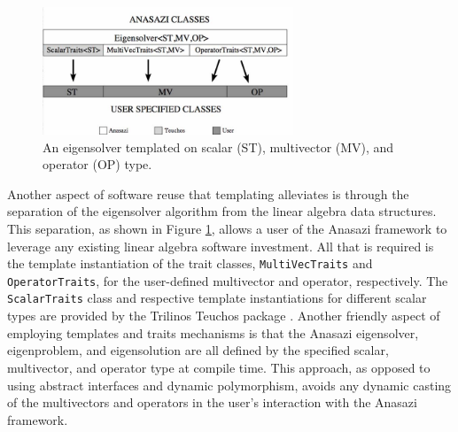 \documentclass[acmtoms,acmnow]{acmtrans2m}
\newcommand{\aspace}[1]{\texttt{#1}}
\begin{document}
\begin{figure}[htb]
\label{fig:latemplate}
\begin{center}
\includegraphics[height=1.5in]{anasazi_linalg_template}
\end{center}
\caption{An eigensolver templated on scalar (ST), multivector (MV), and
operator (OP) type.}
\end{figure}

Another aspect of software reuse that templating alleviates is through the separation of the
eigensolver algorithm from the linear algebra data structures.  This separation, as shown in
Figure \ref{fig:latemplate}, allows a user of the Anasazi framework to leverage any existing 
linear algebra software investment.  All that is required is the template instantiation of the trait
classes, \aspace{MultiVecTraits} and \aspace{OperatorTraits}, for the user-defined multivector 
and operator, respectively.  The \aspace{ScalarTraits} class and respective template 
instantiations for different scalar types are provided by the Trilinos Teuchos package 
\cite{Trilinos:Teuchos}. Another friendly aspect of employing templates and traits mechanisms
is that the Anasazi eigensolver, eigenproblem, and eigensolution are all defined by the 
specified scalar, multivector, and operator type at compile time.  This approach, as opposed to
using abstract interfaces and dynamic polymorphism, avoids any dynamic casting of the multivectors 
and operators in the user's interaction with the Anasazi framework.
\end{document}
